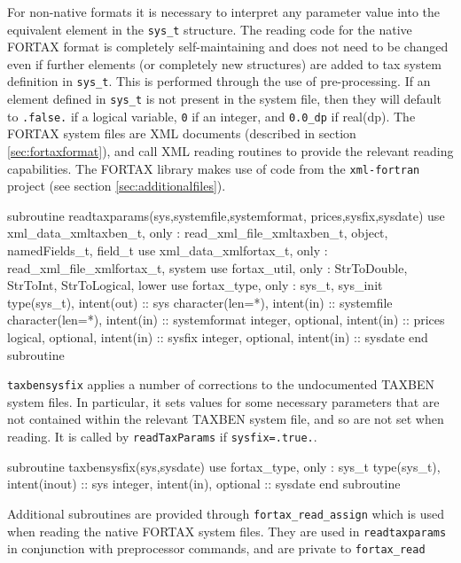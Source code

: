 \documentclass[11pt,thmsa,letter,ukenglish]{article}
\begin{document}
For non-native formats it is necessary to interpret any parameter value into the equivalent element in the \texttt{sys\_t} structure. The reading code for the native FORTAX format is completely self-maintaining and does not need to be changed even if further elements (or completely new structures) are added to tax system definition in \texttt{sys\_t}. This is performed through the use of pre-processing. If an element defined in \texttt{sys\_t} is not present in the system file, then they will default to \texttt{.false.} if a logical variable, \texttt{0} if an integer, and \texttt{0.0\_dp} if real(dp). The FORTAX system files are XML documents (described in section \ref{sec:fortaxformat}), and call XML reading routines to provide the relevant reading capabilities. The FORTAX library makes use of code from the \texttt{xml-fortran} project (see section \ref{sec:additionalfiles}).

\begin{fortrancode}
subroutine readtaxparams(sys,systemfile,systemformat, prices,sysfix,sysdate)
    use xml_data_xmltaxben_t, only : read_xml_file_xmltaxben_t, object, namedFields_t, field_t
    use xml_data_xmlfortax_t, only : read_xml_file_xmlfortax_t, system
    use fortax_util,          only : StrToDouble, StrToInt, StrToLogical, lower
    use fortax_type,          only : sys_t, sys_init
    type(sys_t),       intent(out) :: sys
    character(len=*),  intent(in)  :: systemfile
    character(len=*),  intent(in)  :: systemformat
    integer, optional, intent(in)  :: prices
    logical, optional, intent(in)  :: sysfix
    integer, optional, intent(in)  :: sysdate
end subroutine
\end{fortrancode}

\noindent\texttt{taxbensysfix} applies a number of corrections to the undocumented TAXBEN system files. In particular, it sets values for some necessary parameters that are not contained within the relevant TAXBEN system file, and so are not set when reading. It is called by \texttt{readTaxParams} if \texttt{sysfix=.true.}.

\begin{fortrancode}
subroutine taxbensysfix(sys,sysdate)
    use fortax_type, only : sys_t
    type(sys_t), intent(inout)        :: sys
    integer,     intent(in), optional :: sysdate
end subroutine
\end{fortrancode}

\noindent Additional subroutines are provided through \texttt{fortax\_read\_assign} which is used when reading the native FORTAX system files. They are used in \texttt{readtaxparams} in conjunction with  preprocessor commands, and are private to \texttt{fortax\_read}
\end{document}

